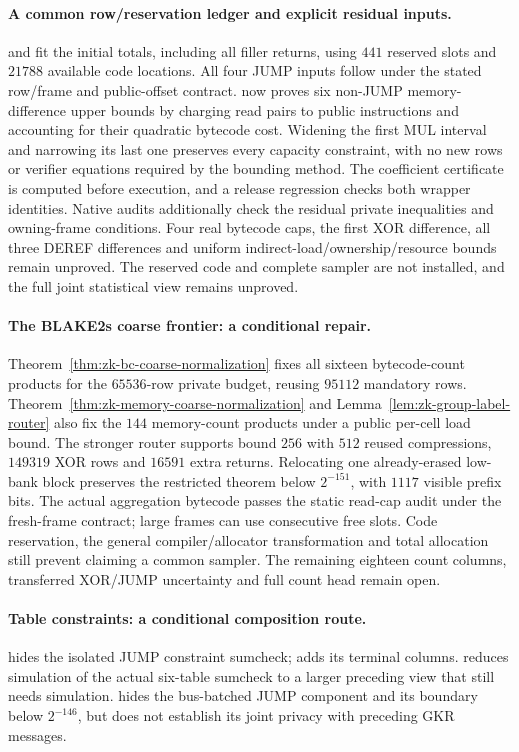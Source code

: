 \paragraph{A common row/reservation ledger and explicit residual inputs.}  and  fit the initial totals, including all filler returns, using $441$ reserved slots and $21788$ available code locations. All four JUMP inputs follow under the stated row/frame and public-offset contract.  now proves six non-JUMP memory-difference upper bounds by charging read pairs to public instructions and accounting for their quadratic bytecode cost. Widening the first MUL interval and narrowing its last one preserves every capacity constraint, with no new rows or verifier equations required by the bounding method. The coefficient certificate is computed before execution, and a release regression checks both wrapper identities. Native audits additionally check the residual private inequalities and owning-frame conditions. Four real bytecode caps, the first XOR difference, all three DEREF differences and uniform indirect-load/ownership/resource bounds remain unproved. The reserved code and complete sampler are not installed, and the full joint statistical view remains unproved.

\paragraph{The BLAKE2s coarse frontier: a conditional repair.} Theorem~\ref{thm:zk-bc-coarse-normalization} fixes all sixteen bytecode-count products for the $65536$-row private budget, reusing $95112$ mandatory rows. Theorem~\ref{thm:zk-memory-coarse-normalization} and Lemma~\ref{lem:zk-group-label-router} also fix the $144$ memory-count products under a public per-cell load bound. The stronger router supports bound $256$ with $512$ reused compressions, $149319$ XOR rows and $16591$ extra returns. Relocating one already-erased low-bank block preserves the restricted theorem below $2^{-151}$, with $1117$ visible prefix bits. The actual aggregation bytecode passes the static read-cap audit under the fresh-frame contract; large frames can use consecutive free slots. Code reservation, the general compiler/allocator transformation and total allocation still prevent claiming a common sampler. The remaining eighteen count columns, transferred XOR/JUMP uncertainty and full count head remain open.

\paragraph{Table constraints: a conditional composition route.}  hides the isolated JUMP constraint sumcheck;  adds its terminal columns.  reduces simulation of the actual six-table sumcheck to a larger preceding view that still needs simulation.  hides the bus-batched JUMP component and its boundary below $2^{-146}$, but does not establish its joint privacy with preceding GKR messages.

